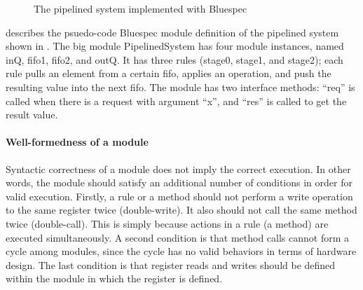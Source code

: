 \begin{figure}[t]
  \caption{The pipelined system implemented with Bluespec}
  \label{ex-pipelined-system-bluespec}
\end{figure}

 describes the psuedo-code
Bluespec module definition of the pipelined system shown in
. The big module PipelinedSystem has four
module instances, named inQ, fifo1, fifo2, and outQ. It has three
rules (stage0, stage1, and stage2); each rule pulls an element from a
certain fifo, applies an operation, and push the resulting value into
the next fifo. The module has two interface methods: ``req'' is called
when there is a request with argument ``x'', and ``res'' is called to
get the result value.

\paragraph{Well-formedness of a module}

Syntactic correctness of a module does not imply the correct
execution. In other words, the module should satisfy an additional
number of conditions in order for valid execution. Firstly, a rule or
a method should not perform a write operation to the same register
twice (double-write). It also should not call the same method twice
(double-call). This is simply because actions in a rule (a method) are
executed simultaneously. A second condition is that method calls
cannot form a cycle among modules, since the cycle has no valid
behaviors in terms of hardware design. The last condition is that
register reads and writes should be defined within the module in which
the register is defined.

